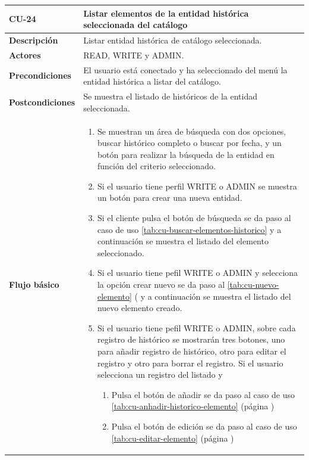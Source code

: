 \begin{table} [H]
    \centering
    \setlength{\leftmargini}{0.4cm}
	\resizebox{15cm}{!} { %
    \begin{tabular}{| m{3cm} | m{12cm} |}   
    \hline
	  \textbf{CU-24} & \textbf{Listar elementos de la entidad histórica seleccionada del catálogo} \\\hline
	  \textbf{Descripción} & Listar entidad histórica de catálogo seleccionada. \\\hline
	  \textbf{Actores} & READ, WRITE y ADMIN. \\\hline
	  \textbf{Precondiciones} & El usuario está conectado y ha seleccionado del menú la entidad histórica a listar del catálogo. \\\hline
	  \textbf{Postcondiciones} & Se muestra el listado de históricos de la entidad seleccionada. \\\hline
	  \textbf{Flujo básico} & 
		\begin{enumerate}
	  	\item Se muestran un área de búsqueda con dos opciones, buscar histórico completo o buscar por fecha, y un botón para realizar la búsqueda de la entidad en función del criterio seleccionado.
	  	\item Si el usuario tiene perfil WRITE o ADMIN se muestra un botón para crear una nueva entidad.
	  	\item Si el cliente pulsa el botón de búsqueda se da paso al caso de uso \ref{tab:cu-buscar-elementos-historico} y a continuación se muestra el listado del elemento seleccionado.
	  	\item Si el usuario tiene pefil WRITE o ADMIN y selecciona la opción crear nuevo se da paso al \ref{tab:cu-nuevo-elemento} (\pageref{tab:cu-nuevo-elemento} y a continuación se muestra el listado del nuevo elemento creado.
		\item Si el usuario tiene pefil WRITE o ADMIN, sobre cada registro de histórico se mostrarán tres botones, uno para añadir registro de histórico, otro para editar el registro y otro para borrar el registro. Si el usuario selecciona un registro del listado y
		    \begin{enumerate}
		         \item Pulsa el botón de añadir se da paso al caso de uso \ref{tab:cu-anhadir-historico-elemento} (página \pageref{tab:cu-anhadir-historico-elemento})
		        \item Pulsa el botón de edición se da paso al caso de uso \ref{tab:cu-editar-elemento} (página \pageref{tab:cu-editar-elemento})

\end{enumerate}
\end{enumerate}
\end{tabular}}
\end{table}
